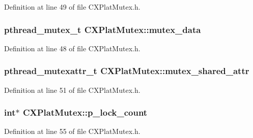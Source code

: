 \-Definition at line 49 of file \-C\-X\-Plat\-Mutex.\-h.

\hypertarget{class_c_x_plat_mutex_a60c63d60e01fde08a5eeb2989bf96436}{
\subsubsection[{mutex\-\_\-data}]{\setlength{\rightskip}{0pt plus 5cm}pthread\-\_\-mutex\-\_\-t {\bf \-C\-X\-Plat\-Mutex\-::mutex\-\_\-data}}}\label{class_c_x_plat_mutex_a60c63d60e01fde08a5eeb2989bf96436}


\-Definition at line 48 of file \-C\-X\-Plat\-Mutex.\-h.

\hypertarget{class_c_x_plat_mutex_a6bfc740435b05cfeee78bdf00839e41a}{
\subsubsection[{mutex\-\_\-shared\-\_\-attr}]{\setlength{\rightskip}{0pt plus 5cm}pthread\-\_\-mutexattr\-\_\-t {\bf \-C\-X\-Plat\-Mutex\-::mutex\-\_\-shared\-\_\-attr}}}\label{class_c_x_plat_mutex_a6bfc740435b05cfeee78bdf00839e41a}


\-Definition at line 51 of file \-C\-X\-Plat\-Mutex.\-h.

\hypertarget{class_c_x_plat_mutex_a15edebbd7d57d152b835053291047500}{
\subsubsection[{p\-\_\-lock\-\_\-count}]{\setlength{\rightskip}{0pt plus 5cm}int$\ast$ {\bf \-C\-X\-Plat\-Mutex\-::p\-\_\-lock\-\_\-count}}}\label{class_c_x_plat_mutex_a15edebbd7d57d152b835053291047500}


\-Definition at line 55 of file \-C\-X\-Plat\-Mutex.\-h.

